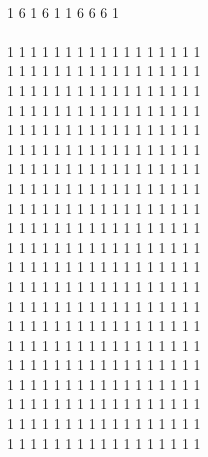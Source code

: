 \documentclass{article}
\begin{document}
 
\hspace{2mm} \\
1 6 1 6 1 1 6 6 6 1 \\




\hspace{2mm} \\
1 1 1 1 1 1 1 1 1 1 1 1 1 1 1 1 1 \\
1 1 1 1 1 1 1 1 1 1 1 1 1 1 1 1 1 \\
1 1 1 1 1 1 1 1 1 1 1 1 1 1 1 1 1 \\
1 1 1 1 1 1 1 1 1 1 1 1 1 1 1 1 1 \\
1 1 1 1 1 1 1 1 1 1 1 1 1 1 1 1 1 \\
1 1 1 1 1 1 1 1 1 1 1 1 1 1 1 1 1 \\
1 1 1 1 1 1 1 1 1 1 1 1 1 1 1 1 1 \\
1 1 1 1 1 1 1 1 1 1 1 1 1 1 1 1 1 \\
1 1 1 1 1 1 1 1 1 1 1 1 1 1 1 1 1 \\
1 1 1 1 1 1 1 1 1 1 1 1 1 1 1 1 1 \\
1 1 1 1 1 1 1 1 1 1 1 1 1 1 1 1 1 \\
1 1 1 1 1 1 1 1 1 1 1 1 1 1 1 1 1 \\
1 1 1 1 1 1 1 1 1 1 1 1 1 1 1 1 1 \\
1 1 1 1 1 1 1 1 1 1 1 1 1 1 1 1 1 \\
1 1 1 1 1 1 1 1 1 1 1 1 1 1 1 1 1 \\
1 1 1 1 1 1 1 1 1 1 1 1 1 1 1 1 1 \\
1 1 1 1 1 1 1 1 1 1 1 1 1 1 1 1 1 \\
1 1 1 1 1 1 1 1 1 1 1 1 1 1 1 1 1 \\
1 1 1 1 1 1 1 1 1 1 1 1 1 1 1 1 1 \\
1 1 1 1 1 1 1 1 1 1 1 1 1 1 1 1 1 \\
1 1 1 1 1 1 1 1 1 1 1 1 1 1 1 1 1 \\
\end{document}
